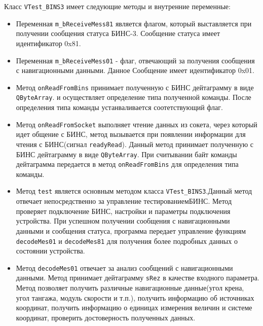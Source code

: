 Класс \texttt{VTest\_BINS3} имеет следующие методы и внутренние переменные:
\begin{itemize}
	\item Переменная \texttt{m\_bReceiveMess81} является флагом, который выставляется при получении сообщения
		статуса БИНС-3. Сообщение статуса имеет идентификатор 0x81.

	\item Переменная \texttt{m\_bReceiveMess01} - флаг, отвечающий за получения сообщения с навигационными данными.
		Данное Сообщение имеет идентификатор 0x01.

	\item Метод \texttt{onReadFromBins} принимает полученную с БИНС дейтаграмму в виде \texttt{QByteArray}.
		и осуществляет определение типа полученной команды. После определения типа команды устанваливается
		соотетствующий флаг.

	\item Метод \texttt{onReadFromSocket} выполняет чтение данных из сокета, через который идет общение с БИНС,
		метод вызывается при появлении информации для чтения с БИНС(сигнал \texttt{readyRead}).
		Данный метод принимает полученную с БИНС дейтаграмму в виде \texttt{QByteArray}.
		При считывании байт команды дейтаграмма передается в метод \texttt{onReadFromBins} для определения типа
		команды.

	\item Метод \texttt{test} является основным методом класса \texttt{VTest\_BINS3}.\break Данный метод отвечает
		непосредственно за управление тестированием\break БИНС. Метод проверяет подключение БИНС, настройки и
		параметры подключения устройства. При успешном получении сообщения с навигационными данными и сообщения
		статуса, программа передает управление функциям \texttt{decodeMes01} и \texttt{decodeMes81} для
		получения более подробных данных о состоянии устройства.

	\item Метод \texttt{decodeMes01} отвечает за анализ сообщений с навигационными данными. Метод принимает
		дейтаграмму \texttt{sRez} в качестве входного параметра. Метод позволяет получить
		различные навигационные данные(угол крена, угол тангажа, модуль скорости и т.п.), получить информацию об
		источниках координат, получить информацию о единицах измерения величин и системе координат, проверить
		достоверность полученных данных.


\end{itemize}
